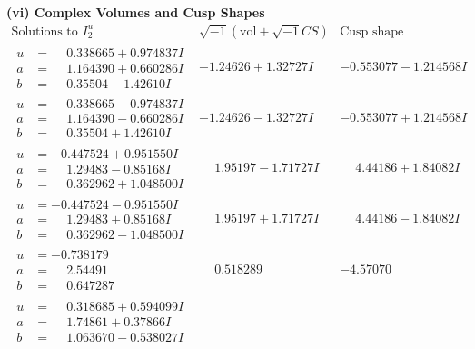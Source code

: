 \documentclass[1p]{elsarticle_modified}
\theoremstyle{definition}
\newcommand{\I}{\sqrt{-1}}
\begin{document}
\newpage\flushleft \textbf{(vi) Complex Volumes and Cusp Shapes}
$$\begin{array}{c|c|c}  
\text{Solutions to }I^u_{2}& \I (\text{vol} + \sqrt{-1}CS) & \text{Cusp shape}\\
 \hline 
\begin{aligned}
u &= \phantom{-}0.338665 + 0.974837 I \\
a &= \phantom{-}1.164390 + 0.660286 I \\
b &= \phantom{-}0.35504 - 1.42610 I\end{aligned}
 & -1.24626 + 1.32727 I & -0.553077 - 1.214568 I \\ \hline\begin{aligned}
u &= \phantom{-}0.338665 - 0.974837 I \\
a &= \phantom{-}1.164390 - 0.660286 I \\
b &= \phantom{-}0.35504 + 1.42610 I\end{aligned}
 & -1.24626 - 1.32727 I & -0.553077 + 1.214568 I \\ \hline\begin{aligned}
u &= -0.447524 + 0.951550 I \\
a &= \phantom{-}1.29483 - 0.85168 I \\
b &= \phantom{-}0.362962 + 1.048500 I\end{aligned}
 & \phantom{-}1.95197 - 1.71727 I & \phantom{-}4.44186 + 1.84082 I \\ \hline\begin{aligned}
u &= -0.447524 - 0.951550 I \\
a &= \phantom{-}1.29483 + 0.85168 I \\
b &= \phantom{-}0.362962 - 1.048500 I\end{aligned}
 & \phantom{-}1.95197 + 1.71727 I & \phantom{-}4.44186 - 1.84082 I \\ \hline\begin{aligned}
u &= -0.738179\phantom{ +0.000000I} \\
a &= \phantom{-}2.54491\phantom{ +0.000000I} \\
b &= \phantom{-}0.647287\phantom{ +0.000000I}\end{aligned}
 & \phantom{-}0.518289\phantom{ +0.000000I} & -4.57070\phantom{ +0.000000I} \\ \hline\begin{aligned}
u &= \phantom{-}0.318685 + 0.594099 I \\
a &= \phantom{-}1.74861 + 0.37866 I \\
b &= \phantom{-}1.063670 - 0.538027 I\end{aligned}

\end{array}$$
\end{document}
